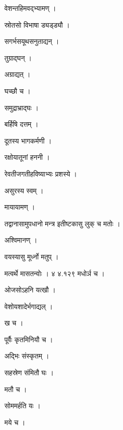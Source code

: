 \documentclass[10pt, openany]{book}
\begin{document}
\noindent वेशन्तहिमवद्भ्यामण् ।

\noindent स्रोतसो विभाषा ड्यड्ड्यौ ।

\noindent सगर्भसयूथसनुताद्यन् ।

\noindent तुग्राद्घन् ।

\noindent अग्राद्यत् ।

\noindent घच्छौ च ।

\noindent समुद्राभ्राद्घः ।

\noindent बर्हिषि दत्तम् ।

\noindent दूतस्य भागकर्मणी ।

\noindent रक्षोयातूनां हननी ।

\noindent रेवतीजगतीहविष्याभ्यः प्रशस्ये ।

\noindent असुरस्य स्वम् ।

\noindent मायायामण् ।

\noindent तद्वानासामुपधानो मन्त्र इतीष्टकासु लुक् च मतोः ।

\noindent अश्विमानण् ।

\noindent वयस्यासु मूर्ध्नो मतुप् ।

\noindent मत्वर्थे मासतन्वोः । ४ ४.१२९ मधोर्ञ च ।

\noindent ओजसोऽहनि यत्खौ ।

\noindent वेशोयशादेर्भगाद्यल् ।

\noindent ख च ।

\noindent पूर्वैः कृतमिनियौ च ।

\noindent अद्भिः संस्कृतम् ।

\noindent सहस्रेण संमितौ घः ।

\noindent मतौ च ।

\noindent सोममर्हति यः ।

\noindent मये च ।
\end{document}
